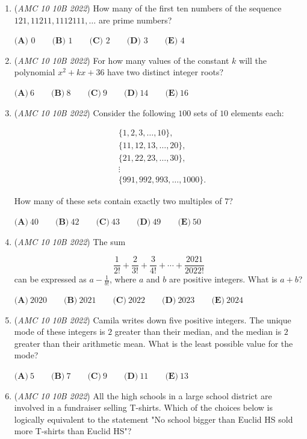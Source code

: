 \begin{enumerate}
	\item (\textit{AMC 10 10B 2022}) How many of the first ten numbers of the sequence $121, 11211, 1112111, \ldots$ are prime numbers?


 $\textbf{(A) } 0 \qquad \textbf{(B) }1 \qquad \textbf{(C) }2 \qquad \textbf{(D) }3 \qquad \textbf{(E) }4$


	\item (\textit{AMC 10 10B 2022}) For how many values of the constant $k$ will the polynomial $x^{2}+kx+36$ have two distinct integer roots?


 $\textbf{(A)}\ 6 \qquad\textbf{(B)}\ 8 \qquad\textbf{(C)}\ 9 \qquad\textbf{(D)}\ 14 \qquad\textbf{(E)}\ 16$


	\item (\textit{AMC 10 10B 2022}) Consider the following $100$ sets of $10$ elements each:

 \begin{align*} &\{1,2,3,\ldots,10\}, \\ &\{11,12,13,\ldots,20\},\\ &\{21,22,23,\ldots,30\},\\ &\vdots\\ &\{991,992,993,\ldots,1000\}. \end{align*}

How many of these sets contain exactly two multiples of $7$?


 $\textbf{(A)}\ 40\qquad\textbf{(B)}\ 42\qquad\textbf{(C)}\ 43\qquad\textbf{(D)}\ 49\qquad\textbf{(E)}\ 50$


	\item (\textit{AMC 10 10B 2022}) The sum

 \[\frac{1}{2!}+\frac{2}{3!}+\frac{3}{4!}+\cdots+\frac{2021}{2022!}\] can be expressed as $a-\frac{1}{b!}$, where $a$ and $b$ are positive integers. What is $a+b$?


 $\textbf{(A)}\ 2020 \qquad\textbf{(B)}\ 2021 \qquad\textbf{(C)}\ 2022 \qquad\textbf{(D)}\ 2023 \qquad\textbf{(E)}\ 2024$


	\item (\textit{AMC 10 10B 2022}) Camila writes down five positive integers. The unique mode of these integers is $2$ greater than their median, and the median is $2$ greater than their arithmetic mean. What is the least possible value for the mode?


 $\textbf{(A)}\ 5 \qquad\textbf{(B)}\ 7 \qquad\textbf{(C)}\ 9 \qquad\textbf{(D)}\ 11 \qquad\textbf{(E)}\ 13$


	\item (\textit{AMC 10 10B 2022}) All the high schools in a large school district are involved in a fundraiser selling T-shirts. Which of the choices below is logically equivalent to the statement "No school bigger than Euclid HS sold more T-shirts than Euclid HS"?



\end{enumerate}
